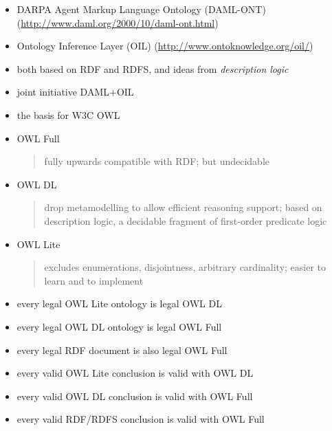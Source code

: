 \documentclass{sepslide-soa-faked} %
\begin{document}
\begin{slide}
\begin{itemize}
\item DARPA Agent Markup Language Ontology (DAML-ONT)
(\url{http://www.daml.org/2000/10/daml-ont.html})
\item Ontology Inference Layer (OIL)
(\url{http://www.ontoknowledge.org/oil/})
\item both based on RDF and RDFS, and ideas from \emph{description logic}
\item joint initiative DAML+OIL
\item the basis for W3C OWL
\end{itemize}
\end{slide}

\begin{slide}
\begin{itemize}
\item OWL Full
\begin{quote}
fully upwards compatible with RDF; but undecidable
\end{quote}
\item OWL DL
\begin{quote}
drop metamodelling to allow efficient reasoning support;
based on description logic, a decidable fragment of first-order predicate logic
\end{quote}
\item OWL Lite
\begin{quote}
excludes enumerations, disjointness, arbitrary cardinality;
easier to learn and to implement
\end{quote}
\end{itemize}
\end{slide}

\begin{slide}
\begin{itemize}
\item every legal OWL Lite ontology is legal OWL DL
\item every legal OWL DL ontology is legal OWL Full
\item every legal RDF document is also legal OWL Full
\medskip
\item every valid OWL Lite conclusion is valid with OWL DL
\item every valid OWL DL conclusion is valid with OWL Full
\item every valid RDF/RDFS conclusion is valid with OWL Full
\end{itemize}
\end{slide}
\end{document}
